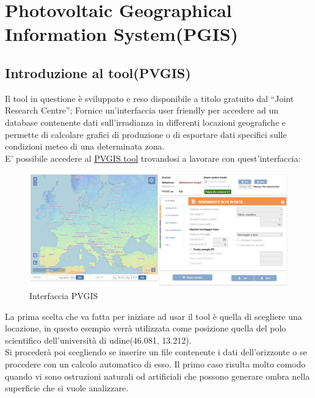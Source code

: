 
\chapter{Photovoltaic Geographical Information System(PGIS)}
\label{chp:Photovoltaic Geographical Information System(PGIS)}

\section{Introduzione al tool(PVGIS)}
Il tool in questione è sviluppato e reso disponibile a titolo gratuito dal \enquote{Joint Research Centre}; Fornice un'interfaccia user friendly per accedere ad un database contenente dati sull'irradianza in differenti locazioni geografiche e permette di calcolare grafici di produzione o di esportare dati specifici sulle condizioni meteo di una determinata zona.\\
E' possibile accedere al \href{https://re.jrc.ec.europa.eu/pvg_tools/it/}{\underline{PVGIS tool}} trovandosi a lavorare con quest'interfaccia:\\
\begin{figure}[H]
    \centering
    \includegraphics[height=0.5\textwidth]{res/cap 4/PGIS_schermata principale}
    \caption{Interfaccia PVGIS}
\end{figure}\noindent
La prima scelta che va fatta per iniziare ad usar il tool è quella di scegliere una locazione, in questo esempio verrà utilizzata come posizione quella del polo scientifico dell'università di udine(46.081, 13.212).\\
Si procederà poi scegliendo se inserire un file contenente i dati dell'orizzonte o se procedere con un calcolo automatico di esso.
Il primo caso risulta molto comodo quando vi sono ostruzioni naturali od artificiali che possono generare ombra nella superficie che si vuole analizzare.\\
